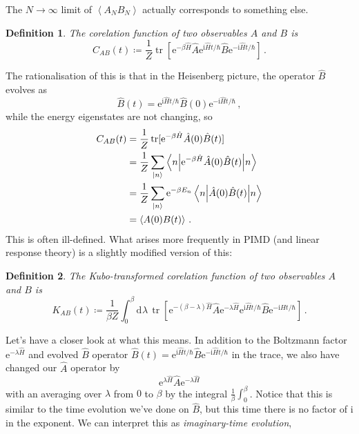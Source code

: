 \documentclass{article}
\theoremstyle{plain}\theoremheaderfont{\normalfont\itshape}\theorembodyfont{\rmfamily}\theoremseparator{.}\newtheorem*{rem}{Remark}\newtheorem*{ex}{Example}\newtheorem*{proof}{Proof}\newtheorem*{altp}{Alternative proof}
\theoremstyle{plain}\theoremheaderfont{\normalfont\bfseries}\theorembodyfont{\rmfamily}\theoremseparator{.}\newtheorem{thm}{Theorem}[section]\newtheorem{lem}[thm]{Lemma}\newtheorem{prop}[thm]{Proposition}\newtheorem*{cor}{Corollary}\newtheorem{defn}[thm]{Definition}\newtheorem{clm}[thm]{Claim}\newtheorem{clminproof}{Claim}
\theoremstyle{break}\theoremheaderfont{\normalfont\itshape}\theorembodyfont{\rmfamily}\theoremseparator{.\medskip}\newtheorem*{proofskip}{Proof}\newtheorem*{exs}{Examples}\newtheorem*{rems}{Remarks}
\theoremstyle{break}\theoremheaderfont{\normalfont\bfseries}\theorembodyfont{\rmfamily}\theoremseparator{.\medskip}\newtheorem{lemskip}[thm]{Lemma}\newtheorem{defnskip}[thm]{Definition}\newtheorem{propskip}[thm]{Proposition}\newtheorem{thmskip}[thm]{Theorem}
\numberwithin{equation}{section}
\newcommand{\ii}{\mathrm{i}}
\newcommand{\ee}{\mathrm{e}}
\newcommand{\dd}[2][]{\mathrm{d}^{#1} #2\,}
\newcommand{\ket}[1]{\left| #1 \right\rangle}
\newcommand{\eval}[1]{\left\langle #1 \right\rangle}
\newcommand{\expval}[2]{\left\langle #2 \middle| #1 \middle| #2 \right\rangle}
\DeclareMathOperator{\tr}{tr}
\begin{document}
    The \(N\to \infty\) limit of \(\eval{A_N B_N}\) actually corresponds to something else.
    \begin{defn}
        The \textit{corelation function} of two observables \(A\) and \(B\) is
        \begin{equation}
            C_{AB}(t)\coloneqq\frac{1}{Z}\tr[\ee^{-\beta\hat{H}}\hat{A}\ee^{\ii\hat{H}t/\hbar}\hat{B}\ee^{-\ii\hat{H}t/\hbar}]\,.
        \end{equation}
    \end{defn}
    The rationalisation of this is that in the Heisenberg picture, the operator \(\hat{B}\) evolves as
    \begin{equation}
        \hat{B}(t)=\ee^{\ii\hat{H}t/\hbar}\hat{B}(0)\ee^{-\ii\hat{H}t/\hbar}\,,
    \end{equation}
    while the energy eigenstates are not changing, so
    \begin{align}
            C_{AB}(t)&=\frac{1}{Z}\tr[\ee^{-\beta\hat{H}}\hat{A}(0)\hat{B}(t)]\notag\\
            &=\frac{1}{Z}\sum_{\ket{n}}\expval{\ee^{-\beta \hat{H}}\hat{A}(0)\hat{B}(t)}{n}\notag \\
            &=\frac{1}{Z}\sum_{\ket{n}}\ee^{-\beta E_n}\expval{\hat{A}(0)\hat{B}(t)}{n}\notag \\
            &=\eval{A(0)B(t)}\,.
    \end{align}
    This is often ill-defined. What arises more frequently in PIMD (and linear response theory) is a slightly modified version of this:
    \begin{defn}
        The \textit{Kubo-transformed corelation function} of two observables \(A\) and \(B\) is
        \begin{equation}
            K_{AB}(t)\coloneqq\frac{1}{\beta Z}\int_{0}^{\beta}\dd{\lambda}\tr[\ee^{-(\beta-\lambda)\hat{H}}\hat{A}\ee^{-\lambda\hat{H}}\ee^{\ii\hat{H}t/\hbar}\hat{B}\ee^{-\ii\hat{H}t/\hbar}]\,.
        \end{equation}
    \end{defn}
    Let's have a closer look at what this means. In addition to the Boltzmann factor \(\ee^{-\lambda\hat{H}}\) and evolved \(\hat{B}\) operator \(\hat{B}(t)=\ee^{\ii\hat{H}t/\hbar}\hat{B}\ee^{-\ii\hat{H}t/\hbar}\) in the trace, we also have changed our \(\hat{A}\) operator by
    \begin{equation}
        \ee^{\lambda\hat{H}}\hat{A}\ee^{-\lambda\hat{H}}
    \end{equation}
    with an averaging over \(\lambda\) from \(0\) to \(\beta\) by the integral \(\frac{1}{\beta}\int_{0}^{\beta}\). Notice that this is similar to the time evolution we've done on \(\hat{B}\), but this time there is no factor of \(\ii\) in the exponent. We can interpret this as \textit{imaginary-time evolution},
\end{document}
